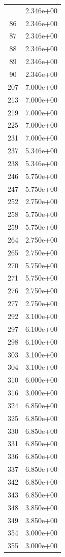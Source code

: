 \documentclass[12pt]{article}
\begin{document}
\begin{longtable}{@{}cc@{}}
\bottomrule
\endlastfoot
85 & 2.346e+00 \\
86 & 2.346e+00 \\
87 & 2.346e+00 \\
88 & 2.346e+00 \\
89 & 2.346e+00 \\
90 & 2.346e+00 \\
207 & 7.000e+00 \\
213 & 7.000e+00 \\
219 & 7.000e+00 \\
225 & 7.000e+00 \\
231 & 7.000e+00 \\
237 & 5.346e+00 \\
238 & 5.346e+00 \\
246 & 5.750e+00 \\
247 & 5.750e+00 \\
252 & 2.750e+00 \\
258 & 5.750e+00 \\
259 & 5.750e+00 \\
264 & 2.750e+00 \\
265 & 2.750e+00 \\
270 & 5.750e+00 \\
271 & 5.750e+00 \\
276 & 2.750e+00 \\
277 & 2.750e+00 \\
292 & 3.100e+00 \\
297 & 6.100e+00 \\
298 & 6.100e+00 \\
303 & 3.100e+00 \\
304 & 3.100e+00 \\
310 & 6.000e+00 \\
316 & 3.000e+00 \\
324 & 6.850e+00 \\
325 & 6.850e+00 \\
330 & 6.850e+00 \\
331 & 6.850e+00 \\
336 & 6.850e+00 \\
337 & 6.850e+00 \\
342 & 6.850e+00 \\
343 & 6.850e+00 \\
348 & 3.850e+00 \\
349 & 3.850e+00 \\
354 & 3.000e+00 \\
355 & 3.000e+00 \\

\bottomrule
\end{longtable}
\end{document}
